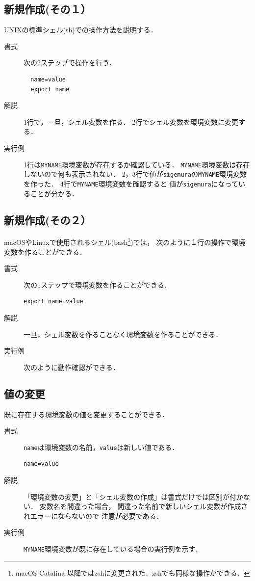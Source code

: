\subsection{新規作成(その１）}
UNIXの標準シェル(sh)での操作方法を説明する．

\begin{description}
\item[書式] 次の2ステップで操作を行う．
\begin{lstlisting}
  name=value
  export name
\end{lstlisting}
\item[解説]
  1行で，一旦，シェル変数を作る．
  2行でシェル変数を環境変数に変更する．
\item[実行例]
  1行は\texttt{MYNAME}環境変数が存在するか確認している．
  \texttt{MYNAME}環境変数は存在しないので何も表示されない．
  2，3行で値が\texttt{sigemura}の\texttt{MYNAME}環境変数を作った．
  4行で\texttt{MYNAME}環境変数を確認すると
  値が\texttt{sigemura}になっていることが分かる．
  
\end{description}

\subsection{新規作成(その２）}
macOSやLinuxで使用されるシェル(bash\footnote{
  macOS Catalina 以降ではzshに変更された．zshでも同様な操作ができる．})では，
次のように１行の操作で環境変数を作ることができる．

\begin{description}
\item[書式]
  次の1ステップで環境変数を作ることができる．
\begin{lstlisting}[numbers=none]
  export name=value
\end{lstlisting}
\item[解説]
  一旦，シェル変数を作ることなく環境変数を作ることができる．
\item[実行例]
  次のように動作確認ができる．
  
\end{description}

\subsection{値の変更}
既に存在する環境変数の値を変更することができる．

\begin{description}
\item [書式]
  \texttt{name}は環境変数の名前，\texttt{value}は新しい値である．
\begin{lstlisting}[numbers=none]
  name=value
\end{lstlisting}
\item [解説]
  「環境変数の変更」と「シェル変数の作成」は書式だけでは区別が付かない．
  変数名を間違った場合，
  間違った名前で新しいシェル変数が作成されエラーにならないので
  注意が必要である．
\item [実行例]
  \texttt{MYNAME}環境変数が既に存在している場合の実行例を示す．
  
\end{description}

